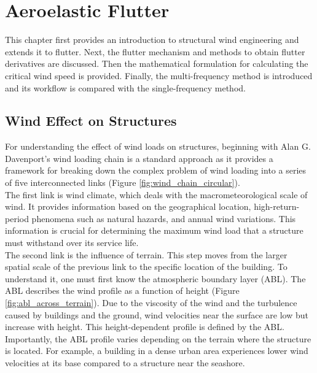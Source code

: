 \documentclass[../main]{subfiles}
\begin{document}
\chapter{Aeroelastic Flutter}
\label{cha:flutter}

This chapter first provides an introduction to structural wind engineering and extends it to flutter. Next, the flutter mechanism and 
methods to obtain flutter derivatives are discussed. Then the mathematical formulation for calculating the critical wind speed is provided. 
Finally, the multi-frequency method is introduced and its workflow is compared with the single-frequency method.


\section{Wind Effect on Structures}

For understanding the effect of wind loads on structures, beginning with Alan G. Davenport's wind loading chain is a standard approach 
as it provides a framework for breaking down the complex problem of wind loading into a series of five interconnected links (Figure \ref{fig:wind_chain_circular}). \\

The first link is wind climate, which deals with the macrometeorological scale of wind. It provides information based on the 
geographical location, high-return-period phenomena such as natural hazards, and annual wind variations. This information 
is crucial for determining the maximum wind load that a structure must withstand over its service life. \\

The second link is the influence of terrain. This step moves from the larger spatial scale of the previous link to the 
specific location of the building. To understand it, one must first know the atmospheric boundary layer (ABL). The ABL 
describes the wind profile as a function of height (Figure \ref{fig:abl_across_terrain}). Due to the viscosity of the wind and the turbulence caused by buildings 
and the ground, wind velocities near the surface are low but increase with height. This height-dependent profile is defined 
by the ABL. Importantly, the ABL profile varies depending on the terrain where the structure is located. For example, a 
building in a dense urban area experiences lower wind velocities at its base compared to a structure near the seashore. \\
\end{document}
